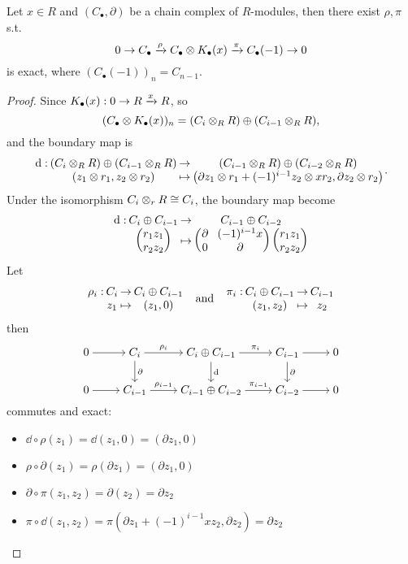 \begin{prop}
  Let $x \in R$ and $(C_\bullet, \partial)$ be a chain complex of $R$-modules,
  then there exist $\rho, \pi$ s.t.
  $$
  0 \to C_\bullet \xrightarrow{\rho} C_\bullet \otimes K_\bullet(x) \xrightarrow{\pi} C_\bullet(-1) \to 0
  $$
  is exact, where $\left( C_\bullet(-1) \right)_n = C_{n-1}$.

  \begin{proof}
    Since $K_\bullet(x) : 0 \to R \xrightarrow{x} R$, so
    $$
    (C_\bullet \otimes K_\bullet(x))_n = (C_i \otimes_R R) \oplus (C_{i-1} \otimes_R R),
    $$
    and the boundary map is
    $$
    \deffunc{\dd}{(C_i \Ot_R R) \Op (C_{i-1} \Ot_R R)}{(C_{i-1} \Ot_R R) \Op (C_{i-2} \Ot_R R)}
    {(z_1 \Ot r_1, z_2 \Ot r_2)}
    {\left( \partial z_1 \Ot r_1 + (-1)^{i-1} z_2 \Ot x r_2,
    \partial z_2 \Ot r_2 \right)}.
    $$
    Under the isomorphism $C_i \otimes_r R \cong C_i$, the boundary map become
    $$
    \deffunc{\dd}{C_i \Op C_{i-1}}{C_{i-1} \Op C_{i-2}}
    {
    \begin{pmatrix}
      r_1 z_1 \\ r_2 z_2
    \end{pmatrix}
    }
    {
    \begingroup
    \setlength\arraycolsep{4pt}
    \begin{pmatrix}
      \partial & (-1)^{i-1} x \\ 0 & \partial
    \end{pmatrix}
    \begin{pmatrix}
      r_1 z_1 \\ r_2 z_2
    \end{pmatrix}
    \endgroup
    }
    $$
    Let 
    $$
      \deffunc{\rho_i}{C_i}{C_i \Op C_{i-1}}{z_1}{(z_1, 0)}
      \quad \text{and} \quad
      \deffunc{\pi_i}{C_i \Op C_{i-1}}{C_{i-1}}{(z_1, z_2)}{z_2}
    $$
    then
    $$
    \begin{tikzcd}[cramped]
      0 \ar[r] & C_i \ar[r, "\rho_i"] \ar[d, "\partial"] & 
      C_i \Op C_{i-1} \ar[r, "\pi_i"] \ar[d, "\dd"] 
      & C_{i-1} \ar[r] \ar[d, "\partial"] & 0 \\
      0 \ar[r] & C_{i-1} \ar[r, "\rho_{i-1}"] & 
      C_{i-1} \Op C_{i-2} \ar[r, "\pi_{i-1}"] & C_{i-2} \ar[r] & 0
    \end{tikzcd}
    $$
    commutes and exact:
    \begin{itemize}
      \item $\dd \circ \rho (z_1) = \dd (z_1, 0) = (\partial z_1, 0)$
      \item $\rho \circ \partial (z_1) = \rho(\partial z_1) = (\partial z_1, 0)$
      \item $\partial \circ \pi (z_1, z_2) = \partial(z_2) = \partial z_2$
      \item $\pi \circ \dd (z_1, z_2) = \pi(\partial z_1 + (-1)^{i-1} x z_2, \partial z_2)
        = \partial z_2$
    \end{itemize}
  \end{proof}
\end{prop}

